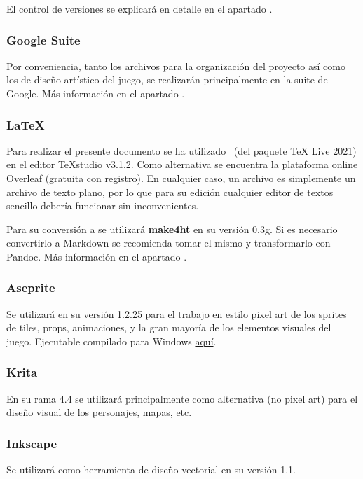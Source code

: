 El control de versiones se explicará en detalle en el apartado .

\subsubsection{Google Suite}
Por conveniencia, tanto los archivos para la organización del proyecto así como los de diseño artístico del juego, se realizarán principalmente en la suite de Google. Más información en el apartado .

\subsubsection{LaTeX}
Para realizar el presente documento se ha utilizado \LaTeXe\ (del paquete TeX Live 2021) en el editor TeXstudio v3.1.2. Como alternativa se encuentra la plataforma online \href{https://www.overleaf.com/}{Overleaf} (gratuita con registro). En cualquier caso, un archivo  es simplemente un archivo de texto plano, por lo que para su edición cualquier editor de textos sencillo debería funcionar sin inconvenientes.

Para su conversión a  se utilizará \textbf{make4ht} en su versión 0.3g. Si es necesario convertirlo a Markdown se recomienda tomar el mismo  y transformarlo con Pandoc. Más información en el apartado .

\subsubsection{Aseprite}
Se utilizará en su versión 1.2.25 para el trabajo en estilo pixel art de los sprites de tiles, props, animaciones,  y la gran mayoría de los elementos visuales del juego. Ejecutable compilado para Windows \href{https://drive.google.com/drive/folders/1DPhGeg7WzV9j81u3B5isgsXqoMtfd_Uv?usp=sharing}{aquí}.

\subsubsection{Krita}
En su rama 4.4 se utilizará principalmente como alternativa (no pixel art) para el diseño visual de los personajes, mapas, etc.

\subsubsection{Inkscape}
Se utilizará como herramienta de diseño vectorial en su versión 1.1.

